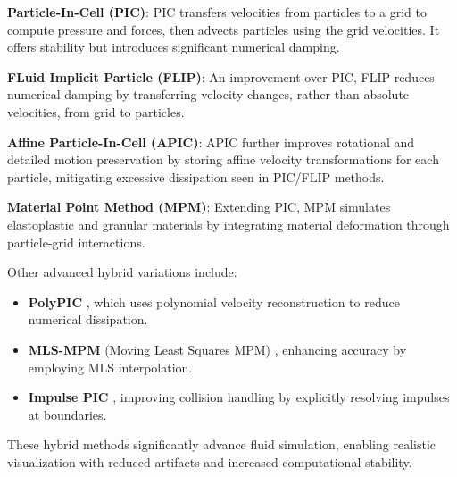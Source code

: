 \textbf{Particle-In-Cell (PIC)}: 
PIC \citep{tskhakaya2007particle} transfers velocities from particles to a grid to compute pressure and forces, then advects particles using the grid velocities.
It offers stability but introduces significant numerical damping.

\textbf{FLuid Implicit Particle (FLIP)}:
An improvement over PIC, FLIP \citep{brackbill1988flip} reduces numerical damping by transferring velocity changes,
rather than absolute velocities, from grid to particles.

\textbf{Affine Particle-In-Cell (APIC)}:
APIC \citep{jiang2015affine} further improves rotational and detailed motion preservation by storing affine velocity transformations for each particle, mitigating excessive dissipation seen in PIC/FLIP methods.

\textbf{Material Point Method (MPM)}:
Extending PIC, MPM \citep{bardenhagen2000material} simulates elastoplastic and granular materials by integrating material deformation through particle-grid interactions. 

Other advanced hybrid variations include:
\begin{itemize}
\item \textbf{PolyPIC} \citep{fu2017polynomial}, which uses polynomial velocity reconstruction to reduce numerical dissipation.
\item \textbf{MLS-MPM} (Moving Least Squares MPM) \citep{hu2018moving}, enhancing accuracy by employing MLS interpolation.
\item \textbf{Impulse PIC} \citep{feng2022impulse}, improving collision handling by explicitly resolving impulses at boundaries.
\end{itemize}

These hybrid methods significantly advance fluid simulation, enabling realistic visualization with reduced artifacts and increased computational stability.